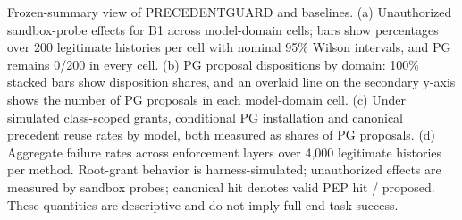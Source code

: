\caption{
Frozen-summary view of PRECEDENTGUARD and baselines.
(a) Unauthorized sandbox-probe effects for B1 across model-domain cells; bars show percentages over 200 legitimate histories per cell with nominal 95\% Wilson intervals, and PG remains 0/200 in every cell.
(b) PG proposal dispositions by domain: 100\% stacked bars show disposition shares, and an overlaid line on the secondary y-axis shows the number of PG proposals in each model-domain cell.
(c) Under simulated class-scoped grants, conditional PG installation and canonical precedent reuse rates by model, both measured as shares of PG proposals.
(d) Aggregate failure rates across enforcement layers over 4{,}000 legitimate histories per method.
Root-grant behavior is harness-simulated; unauthorized effects are measured by sandbox probes; canonical hit denotes valid PEP hit / proposed.
These quantities are descriptive and do not imply full end-task success.
}
